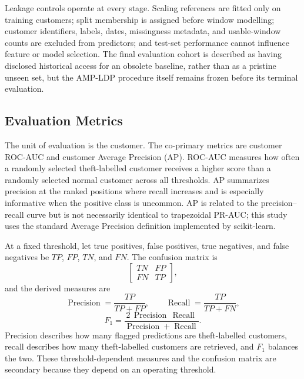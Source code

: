 Leakage controls operate at every stage. Scaling references are fitted only on training customers; split membership is assigned before window modelling; customer identifiers, labels, dates, missingness metadata, and usable-window counts are excluded from predictors; and test-set performance cannot influence feature or model selection. The final evaluation cohort is described as having disclosed historical access for an obsolete baseline, rather than as a pristine unseen set, but the AMP-LDP procedure itself remains frozen before its terminal evaluation.

\subsection{Evaluation Metrics}\label{sec:metrics}

The unit of evaluation is the customer. The co-primary metrics are customer ROC-AUC and customer Average Precision (AP). ROC-AUC measures how often a randomly selected theft-labelled customer receives a higher score than a randomly selected normal customer across all thresholds. AP summarizes precision at the ranked positions where recall increases and is especially informative when the positive class is uncommon. AP is related to the precision--recall curve but is not necessarily identical to trapezoidal PR-AUC; this study uses the standard Average Precision definition implemented by scikit-learn.

At a fixed threshold, let true positives, false positives, true negatives, and false negatives be $TP$, $FP$, $TN$, and $FN$. The confusion matrix is
\begin{equation}
 \begin{bmatrix}TN & FP\\ FN & TP\end{bmatrix},
\end{equation}
and the derived measures are
\begin{equation}
 \operatorname{Precision}=\frac{TP}{TP+FP},\qquad
 \operatorname{Recall}=\frac{TP}{TP+FN},
 \label{eq:precision-recall}
\end{equation}
\begin{equation}
 F_1=\frac{2\,\operatorname{Precision}\,\operatorname{Recall}}
 {\operatorname{Precision}+\operatorname{Recall}}.
 \label{eq:f1}
\end{equation}
Precision describes how many flagged predictions are theft-labelled customers, recall describes how many theft-labelled customers are retrieved, and $F_1$ balances the two. These threshold-dependent measures and the confusion matrix are secondary because they depend on an operating threshold.

